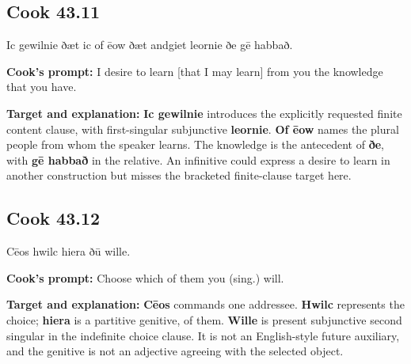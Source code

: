 \par\begin{minipage}{\linewidth}\raggedright
\subsection*{Cook 43.11}

Ic gewilnie ðæt ic of ēow ðæt andgiet leornie ðe gē habbað.

\textbf{Cook's prompt:} I desire to learn [that I may learn] from you the knowledge that you have.

\textbf{Target and explanation:} \textbf{Ic gewilnie} introduces the explicitly requested finite content clause, with first-singular subjunctive \textbf{leornie}. \textbf{Of ēow} names the plural people from whom the speaker learns. The knowledge is the antecedent of \textbf{ðe}, with \textbf{gē habbað} in the relative. An infinitive could express a desire to learn in another construction but misses the bracketed finite-clause target here.

\end{minipage}\par\addvspace{4pt}

\par\begin{minipage}{\linewidth}\raggedright
\subsection*{Cook 43.12}

Cēos hwilc hiera ðū wille.

\textbf{Cook's prompt:} Choose which of them you (sing.) will.

\textbf{Target and explanation:} \textbf{Cēos} commands one addressee. \textbf{Hwilc} represents the choice; \textbf{hiera} is a partitive genitive, of them. \textbf{Wille} is present subjunctive second singular in the indefinite choice clause. It is not an English-style future auxiliary, and the genitive is not an adjective agreeing with the selected object.

\end{minipage}\par\addvspace{4pt}

